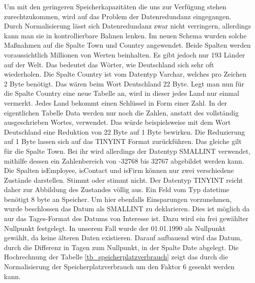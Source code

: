 Um mit den geringeren Speicherkapazitäten die uns zur Verfügung stehen zurechtzukommen, wird auf das Problem der Datenredundanz eingegangen. Durch Normalisierung lässt sich Datenredundanz zwar nicht verringern, allerdings kann man sie in kontrollierbare Bahnen lenken. Im neuen Schema wurden solche Maßnahmen auf die Spalte Town und Country angewendet. Beide Spalten werden voraussichtlich Millionen von Werten beinhalten. Es gibt jedoch nur 193 Länder auf der Welt. Das bedeutet das Wörter, wie Deutschland sich sehr oft wiederholen. Die Spalte Country ist vom Datentyp Varchar, welches pro Zeichen 2 Byte benötigt. Das wären beim Wort Deutschland 22 Byte. Legt man nun für die Spalte Country eine neue Tabelle an, wird in dieser jedes Land nur einmal vermerkt. Jedes Land bekommt einen Schlüssel in Form einer Zahl. In der eigentlichen Tabelle Data werden nur noch die Zahlen, anstatt des vollständig ausgeschrieben Wortes, verwendet. Das würde beispielsweise mit dem Wort Deutschland eine Reduktion von 22 Byte auf 1 Byte bewirken. Die Reduzierung auf 1 Byte lassen sich auf das TINYINT Format zurückführen. Das gleiche gilt für die Spalte Town. Bei ihr wird allerdings der Datentyp SMALLINT verwendet, mithilfe dessen ein Zahlenbereich von -32768 bis 32767 abgebildet werden kann. Die Spalten isEmployee, isContact und isFirm können nur zwei verschiedene Zustände darstellen. Stimmt oder stimmt nicht. Der Datentyp TINYINT reicht daher zur Abbildung des Zustandes völlig aus. Ein Feld vom Typ datetime benötigt 8 byte an Speicher. Um hier ebenfalls Einsparungen vorzunehmen, wurde beschlossen das Datum als SMALLINT zu deklarieren. Dies ist möglich da nur das Tages-Format des Datums von Interesse ist. Dazu wird ein frei gewählter Nullpunkt festgelegt. In unserem Fall wurde der 01.01.1990 als Nullpunkt gewählt, da keine älteren Daten existieren. Darauf aufbauend wird das Datum, durch die Differenz in Tagen zum Nullpunkt, in der Spalte Date abgelegt. Die Hochrechnung der Tabelle \ref{tb_speicherplatzverbrauch} zeigt das durch die Normalisierung der Speicherplatzverbrauch um den Faktor 6 gesenkt werden kann.

